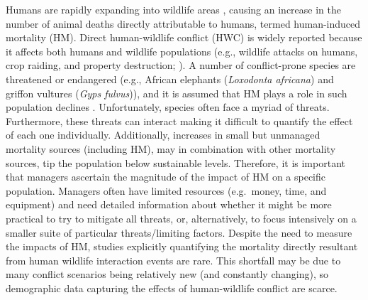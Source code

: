 \documentclass[11pt,]{article}
\begin{document}
Humans are rapidly expanding into wildlife areas \citep{Watson2016},
causing an increase in the number of animal deaths directly attributable
to humans, termed human-induced mortality (HM). Direct human-wildlife
conflict (HWC) is widely reported because it affects both humans and
wildlife populations (e.g., wildlife attacks on humans, crop raiding,
and property destruction; \citet{Woodroffe2005}). A number of
conflict-prone species are threatened or endangered (e.g., African
elephants (\emph{Loxodonta africana}) and griffon vultures (\emph{Gyps
fulvus})), and it is assumed that HM plays a role in such population
declines \citep{thouless1994, landa1999, margalida2014}. Unfortunately,
species often face a myriad of threats. Furthermore, these threats can
interact making it difficult to quantify the effect of each one
individually. Additionally, increases in small but unmanaged mortality
sources (including HM), may in combination with other mortality sources,
tip the population below sustainable levels. Therefore, it is important
that managers ascertain the magnitude of the impact of HM on a specific
population. Managers often have limited resources (e.g.~money, time, and
equipment) and need detailed information about whether it might be more
practical to try to mitigate all threats, or, alternatively, to focus
intensively on a smaller suite of particular threats/limiting factors.
Despite the need to measure the impacts of HM, studies explicitly
quantifying the mortality directly resultant from human wildlife
interaction events are rare. This shortfall may be due to many conflict
scenarios being relatively new (and constantly changing), so demographic
data capturing the effects of human-wildlife conflict are scarce.
\end{document}
